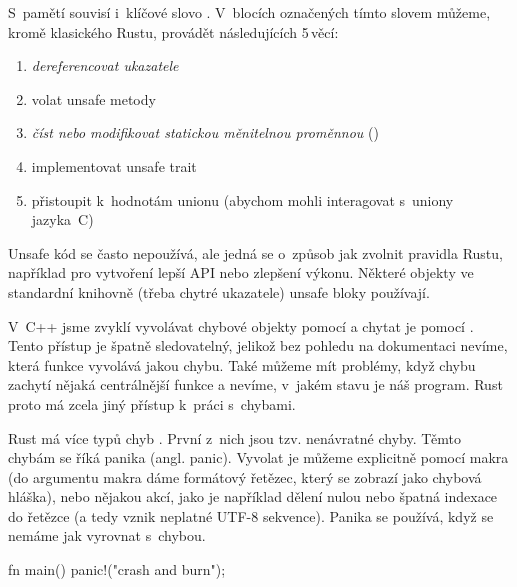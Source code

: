 \documentclass[main.tex]{subfiles}
\begin{document}

S~pamětí souvisí i~klíčové slovo . V~blocích označených tímto slovem můžeme,
kromě klasického  Rustu, provádět následujících 5\,věcí:
\begin{enumerate}
    \item \emph{dereferencovat ukazatele}
    \item volat unsafe metody
    \item \emph{číst nebo modifikovat statickou měnitelnou proměnnou} ()
    \item implementovat unsafe trait
    \item přistoupit k~hodnotám unionu (abychom mohli interagovat s~uniony jazyka~C)
\end{enumerate}

Unsafe kód se často nepoužívá, ale jedná se o~způsob jak zvolnit pravidla Rustu, například
pro vytvoření lepší API nebo zlepšení výkonu. Některé objekty ve standardní knihovně
(třeba chytré ukazatele) unsafe bloky používají. \cite[sekce\,19.1]{thebook}


V~C++ jsme zvyklí vyvolávat chybové objekty pomocí  a chytat je pomocí
. Tento přístup je špatně sledovatelný, jelikož bez pohledu na dokumentaci
nevíme, která funkce vyvolává jakou chybu. Také můžeme mít problémy, když chybu zachytí
nějaká centrálnější funkce a nevíme, v~jakém stavu je náš program. Rust proto má zcela
jiný přístup k~práci s~chybami.


Rust má více typů chyb \cite[kapitola\,9]{thebook}. První z~nich jsou tzv. nenávratné
chyby. Těmto chybám se říká panika (angl. panic). Vyvolat je můžeme explicitně pomocí
makra  (do argumentu makra dáme formátový řetězec, který se zobrazí jako
chybová hláška), nebo nějakou akcí, jako je například dělení nulou nebo špatná indexace
do řetězce (a tedy vznik neplatné UTF-8 sekvence). \cite[sekce\,9.1]{thebook} Panika se
používá, když se nemáme jak vyrovnat s~chybou.

\obrazek
\begin{rustcode}
    fn main() {
        panic!("crash and burn");
    }
\end{rustcode}
\newline
{}
\end{document}
